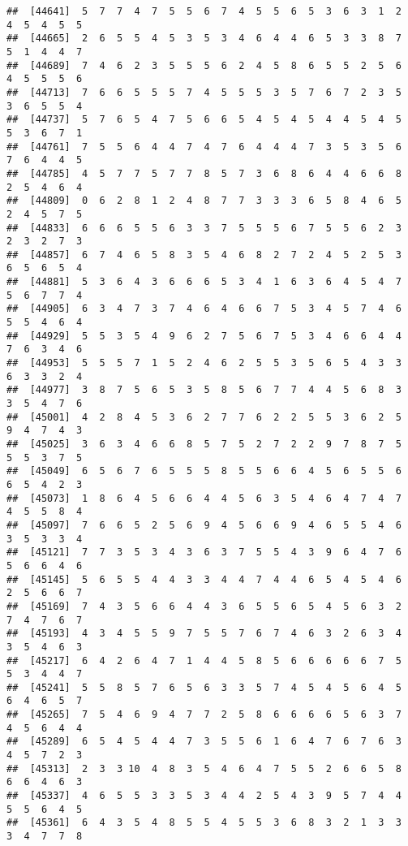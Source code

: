 \documentclass[
]{book}
\begin{document}
\begin{verbatim}
##  [44641]  5  7  7  4  7  5  5  6  7  4  5  5  6  5  3  6  3  1  2  4  5  4  5  5
##  [44665]  2  6  5  5  4  5  3  5  3  4  6  4  4  6  5  3  3  8  7  5  1  4  4  7
##  [44689]  7  4  6  2  3  5  5  5  6  2  4  5  8  6  5  5  2  5  6  4  5  5  5  6
##  [44713]  7  6  6  5  5  5  7  4  5  5  5  3  5  7  6  7  2  3  5  3  6  5  5  4
##  [44737]  5  7  6  5  4  7  5  6  6  5  4  5  4  5  4  4  5  4  5  5  3  6  7  1
##  [44761]  7  5  5  6  4  4  7  4  7  6  4  4  4  7  3  5  3  5  6  7  6  4  4  5
##  [44785]  4  5  7  7  5  7  7  8  5  7  3  6  8  6  4  4  6  6  8  2  5  4  6  4
##  [44809]  0  6  2  8  1  2  4  8  7  7  3  3  3  6  5  8  4  6  5  2  4  5  7  5
##  [44833]  6  6  6  5  5  6  3  3  7  5  5  5  6  7  5  5  6  2  3  2  3  2  7  3
##  [44857]  6  7  4  6  5  8  3  5  4  6  8  2  7  2  4  5  2  5  3  6  5  6  5  4
##  [44881]  5  3  6  4  3  6  6  6  5  3  4  1  6  3  6  4  5  4  7  5  6  7  7  4
##  [44905]  6  3  4  7  3  7  4  6  4  6  6  7  5  3  4  5  7  4  6  5  5  4  6  4
##  [44929]  5  5  3  5  4  9  6  2  7  5  6  7  5  3  4  6  6  4  4  7  6  3  4  6
##  [44953]  5  5  5  7  1  5  2  4  6  2  5  5  3  5  6  5  4  3  3  6  3  3  2  4
##  [44977]  3  8  7  5  6  5  3  5  8  5  6  7  7  4  4  5  6  8  3  3  5  4  7  6
##  [45001]  4  2  8  4  5  3  6  2  7  7  6  2  2  5  5  3  6  2  5  9  4  7  4  3
##  [45025]  3  6  3  4  6  6  8  5  7  5  2  7  2  2  9  7  8  7  5  5  5  3  7  5
##  [45049]  6  5  6  7  6  5  5  5  8  5  5  6  6  4  5  6  5  5  6  6  5  4  2  3
##  [45073]  1  8  6  4  5  6  6  4  4  5  6  3  5  4  6  4  7  4  7  4  5  5  8  4
##  [45097]  7  6  6  5  2  5  6  9  4  5  6  6  9  4  6  5  5  4  6  3  5  3  3  4
##  [45121]  7  7  3  5  3  4  3  6  3  7  5  5  4  3  9  6  4  7  6  5  6  6  4  6
##  [45145]  5  6  5  5  4  4  3  3  4  4  7  4  4  6  5  4  5  4  6  2  5  6  6  7
##  [45169]  7  4  3  5  6  6  4  4  3  6  5  5  6  5  4  5  6  3  2  7  4  7  6  7
##  [45193]  4  3  4  5  5  9  7  5  5  7  6  7  4  6  3  2  6  3  4  3  5  4  6  3
##  [45217]  6  4  2  6  4  7  1  4  4  5  8  5  6  6  6  6  6  7  5  5  3  4  4  7
##  [45241]  5  5  8  5  7  6  5  6  3  3  5  7  4  5  4  5  6  4  5  6  4  6  5  7
##  [45265]  7  5  4  6  9  4  7  7  2  5  8  6  6  6  6  5  6  3  7  4  5  6  4  4
##  [45289]  6  5  4  5  4  4  7  3  5  5  6  1  6  4  7  6  7  6  3  4  5  7  2  3
##  [45313]  2  3  3 10  4  8  3  5  4  6  4  7  5  5  2  6  6  5  8  6  6  4  6  3
##  [45337]  4  6  5  5  3  3  5  3  4  4  2  5  4  3  9  5  7  4  4  5  5  6  4  5
##  [45361]  6  4  3  5  4  8  5  5  4  5  5  3  6  8  3  2  1  3  3  3  4  7  7  8

\end{verbatim}
\end{document}
